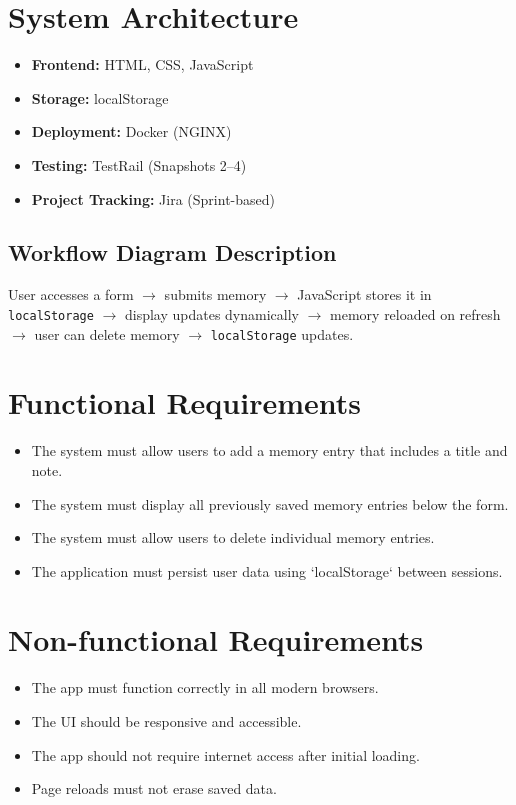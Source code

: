 \documentclass[12pt]{article}
\begin{document}
\section{System Architecture}
\begin{itemize}
  \item \textbf{Frontend:} HTML, CSS, JavaScript
  \item \textbf{Storage:} localStorage
  \item \textbf{Deployment:} Docker (NGINX)
  \item \textbf{Testing:} TestRail (Snapshots 2--4)
  \item \textbf{Project Tracking:} Jira (Sprint-based)
\end{itemize}

\subsection*{Workflow Diagram Description}
User accesses a form $\rightarrow$ submits memory $\rightarrow$ JavaScript stores it in \texttt{localStorage} $\rightarrow$ display updates dynamically $\rightarrow$ memory reloaded on refresh $\rightarrow$ user can delete memory $\rightarrow$ \texttt{localStorage} updates.

\section{Functional Requirements}
\begin{itemize}
  \item The system must allow users to add a memory entry that includes a title and note.
  \item The system must display all previously saved memory entries below the form.
  \item The system must allow users to delete individual memory entries.
  \item The application must persist user data using `localStorage` between sessions.
\end{itemize}

\section{Non-functional Requirements}
\begin{itemize}
  \item The app must function correctly in all modern browsers.
  \item The UI should be responsive and accessible.
  \item The app should not require internet access after initial loading.
  \item Page reloads must not erase saved data.
\end{itemize}
\end{document}
